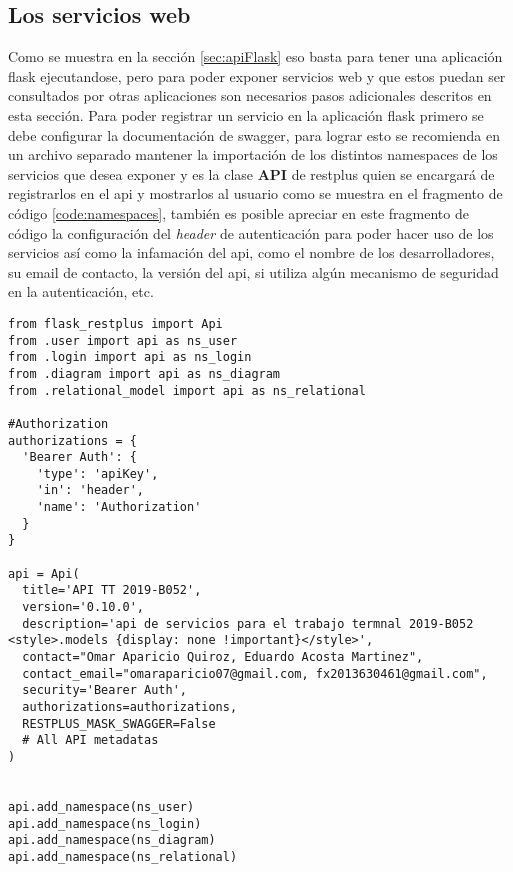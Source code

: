 \subsection{Los servicios web}

Como se muestra en la sección \ref{sec:apiFlask} eso basta para tener una aplicación flask ejecutandose, pero para poder exponer servicios web y que estos puedan ser consultados por otras aplicaciones son necesarios pasos adicionales descritos en esta sección. Para poder registrar un servicio en la aplicación flask primero se debe configurar la documentación de swagger, para lograr esto se recomienda en un archivo separado mantener la importación de los distintos namespaces de los servicios que desea exponer y es la clase \textbf{API} de restplus quien se encargará de registrarlos en el api y mostrarlos al usuario como se muestra en el fragmento de código \ref{code:namespaces}, también es posible apreciar en este fragmento de código la configuración del \textit{header} de autenticación para poder hacer uso de los servicios así como la infamación del api, como el nombre de los desarrolladores, su email de contacto, la versión del api, si utiliza algún mecanismo de seguridad en la autenticación, etc.

\begin{code}
\label{code:namespaces}
\begin{verbatim}
from flask_restplus import Api
from .user import api as ns_user
from .login import api as ns_login
from .diagram import api as ns_diagram
from .relational_model import api as ns_relational

#Authorization
authorizations = {
  'Bearer Auth': {
    'type': 'apiKey',
    'in': 'header',
    'name': 'Authorization'
  }
}

api = Api(
  title='API TT 2019-B052',
  version='0.10.0',
  description='api de servicios para el trabajo termnal 2019-B052 <style>.models {display: none !important}</style>',
  contact="Omar Aparicio Quiroz, Eduardo Acosta Martinez",
  contact_email="omaraparicio07@gmail.com, fx2013630461@gmail.com",
  security='Bearer Auth',
  authorizations=authorizations,
  RESTPLUS_MASK_SWAGGER=False
  # All API metadatas
)


api.add_namespace(ns_user)
api.add_namespace(ns_login)
api.add_namespace(ns_diagram)
api.add_namespace(ns_relational)
\end{verbatim}
\end{code}

